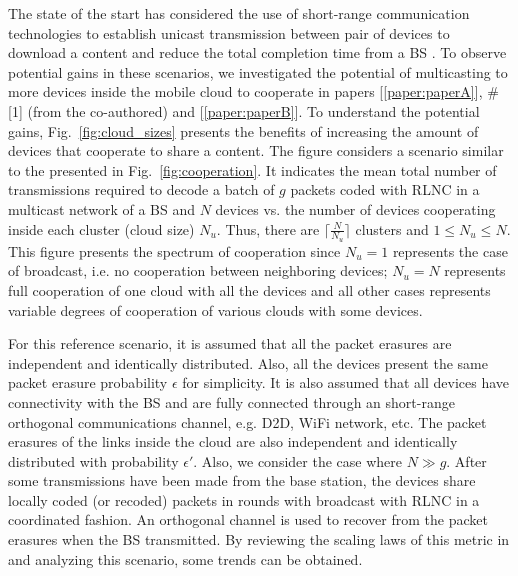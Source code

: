 The state of the start has considered the use of short-range communication technologies to establish unicast transmission between pair of devices to download a content and reduce the total completion time from a \ac{BS} \cite{khamfroush2013minimizing,khamfroush2015optimal}. To observe potential gains in these scenarios, we investigated the potential of multicasting to more devices inside the mobile cloud to cooperate in papers {[\ref{paper:paperA}]}, \#[1] (from the co-authored) and {[\ref{paper:paperB}]}. To understand the potential gains, Fig.~\ref{fig:cloud_sizes} presents the benefits of increasing the amount of devices that cooperate to share a content. The figure considers a scenario similar to the presented in Fig.~\ref{fig:cooperation}. It indicates the mean total number of transmissions required to decode a batch of $g$ packets coded with \ac{RLNC} in a multicast network of a \ac{BS} and $N$ devices vs. the number of devices cooperating inside each cluster (cloud size) $N_u$. Thus, there are $\lceil \frac{N}{N_u} \rceil$ clusters and $1 \leq N_u \leq N$. This figure presents the spectrum of cooperation since $N_u = 1$ represents the case of broadcast, i.e. no cooperation between neighboring devices; $N_u = N$ represents full cooperation of one cloud with all the devices and all other cases represents variable degrees of cooperation of various clouds with some devices.

For this reference scenario, it is assumed that all the packet erasures are independent and identically distributed. Also, all the devices present the same packet erasure probability $\epsilon$ for simplicity. It is also assumed that all devices have connectivity with the \ac{BS} and are fully connected through an short-range orthogonal communications channel, e.g. \ac{D2D}, \ac{WiFi} network, etc. The packet erasures of the links inside the cloud are also independent and identically distributed with probability $\epsilon'$. Also, we consider the case where $N \gg g$. After some transmissions have been made from the base station, the devices share locally coded (or recoded) packets in rounds with broadcast with \ac{RLNC} in a coordinated fashion. An orthogonal channel is used to recover from the packet erasures when the \ac{BS} transmitted. By reviewing the scaling laws of this metric in \cite{eryilmaz2008delay} and analyzing this scenario, some trends can be obtained.

